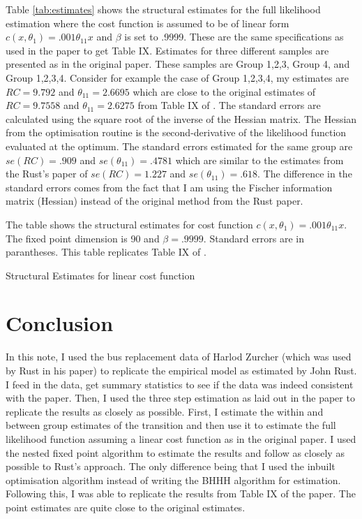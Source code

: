 \documentclass[11pt,letterpaper]{article}
\newcommand{\floatintro}[1]{
  
  \vspace*{0.1in}
  
  {\footnotesize

    #1
    
  }
  
  \vspace*{0.1in} } \newcommand{\Hline}{\noindent\rule{18cm}{0.5pt}}
\begin{document}
Table \ref{tab:estimates} shows the structural estimates for the full
likelihood estimation where the cost function is assumed to be of
linear form $c(x,\theta_1)=.001\theta_{11}x$ and $\beta$ is set to
.9999. These are the same specifications as used in the paper to get
Table IX. Estimates for three different samples are presented as in
the original paper. These samples are Group 1,2,3, Group 4, and Group
1,2,3,4. Consider for example the case of Group 1,2,3,4, my estimates
are $RC=9.792$ and $\theta_{11}=2.6695$ which are close to the
original estimates of $RC=9.7558$ and $\theta_{11}=2.6275$ from Table
IX of \citet{rust1987optimal}. The standard errors are calculated
using the square root of the inverse of the Hessian matrix. The
Hessian from the optimisation routine is the second-derivative of the
likelihood function evaluated at the optimum. The standard errors
estimated for the same group are $se(RC)=.909$ and
$se(\theta_{11})=.4781$ which are similar to the estimates from the
Rust's paper of $se(RC)=1.227$ and $se(\theta_{11})=.618$. The
difference in the standard errors comes from the fact that I am using
the Fischer information matrix (Hessian) instead of the original
method from the Rust paper.
\begin{table}[htbp!]
  \floatintro{The table shows the structural estimates for cost
    function $c(x,\theta_1)=.001\theta_{11}x$. The fixed point
    dimension is 90 and $\beta=.9999$. Standard errors are in parantheses. This table
    replicates Table IX of \citep{rust1987optimal}.}
  \centering
  
  \caption{Structural Estimates for linear cost function}
  \label{tab:estimates}
\end{table}
\section{Conclusion}
In this note, I used the bus replacement data of Harlod Zurcher (which
was used by Rust in his paper) to replicate the empirical model as
estimated by John Rust. I feed in the data, get summary statistics to
see if the data was indeed consistent with the paper. Then, I used the
three step estimation as laid out in the paper to replicate the
results as closely as possible. First, I estimate the within and
between group estimates of the transition and then use it to estimate
the full likelihood function assuming a linear cost function as in the
original paper. I used the nested fixed point algorithm to estimate
the results and follow as closely as possible to Rust's approach. The
only difference being that I used the inbuilt optimisation algorithm
instead of writing the BHHH algorithm for estimation.\\
Following this, I was able to replicate the results from Table IX of
the paper. The point estimates are quite close to the original
estimates.
\end{document}
